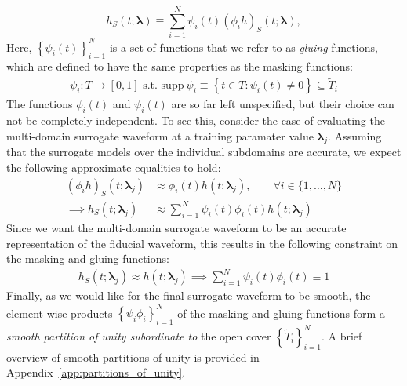\documentclass[aps,prd,amsmath,floats,floatfix, twocolumn,
superscriptaddress,nofootinbib,showpacs,longbibliography]{revtex4-1}
\begin{document}
\begin{equation}
    h_S(t;\bm{\lambda}) \equiv \sum_{i=1}^{N} \psi_i(t)(\phi_i h)_S(t;\bm{\lambda}),
\end{equation}
Here, $\left\{\psi_i(t)\right\}_{i=1}^N$ is a set of functions that we refer to as \textit{gluing} functions, which are defined to have the same properties as the masking functions:
\begin{multline*}
    \psi_i :T\rightarrow [0,1]\text{ s.t. }\text{supp}\ \psi_i \equiv \left\{t\in T : \psi_i (t)\neq 0\right\}\subseteq \tilde{T}_i
\end{multline*}
The functions $\phi_i(t)$ and $\psi_i(t)$ are so far left unspecified, but their choice can not be completely independent. To see this, consider the case of evaluating the multi-domain surrogate waveform at a training paramater value $\bm{\lambda}_j$. Assuming that the surrogate models over the individual subdomains are accurate, we expect the following approximate equalities to hold:
\begin{align*}
    (\phi_i h)_S(t;\bm{\lambda}_j) &\approx \phi_i(t)h(t;\bm{\lambda}_j),\qquad \forall i\in\{1,\ldots,N\}\\
    \implies h_S(t;\bm{\lambda}_j)&\approx \sum_{i=1}^{N} \psi_i(t)\phi_i(t)h(t;\bm{\lambda}_j)
\end{align*}
Since we want the multi-domain surrogate waveform to be an accurate representation of the fiducial waveform, this results in the following constraint on the masking and gluing functions:
\begin{align}
    h_S(t;\bm{\lambda}_j) \approx h(t;\bm{\lambda}_j)\implies \boxed{\sum_{i=1}^{N} \psi_i(t)\phi_i(t) \equiv 1}
\end{align}
Finally, as we would like for the final surrogate waveform to be smooth, the element-wise products $\left\{\psi_i \phi_i\right\}_{i=1}^{N}$ of the masking and gluing functions form a \textit{smooth partition of unity subordinate to} the open cover $\left\{\tilde{T}_i\right\}_{i=1}^{N}$. A brief overview of smooth partitions of unity is provided in Appendix~\ref{app:partitions_of_unity}.

\end{document}
